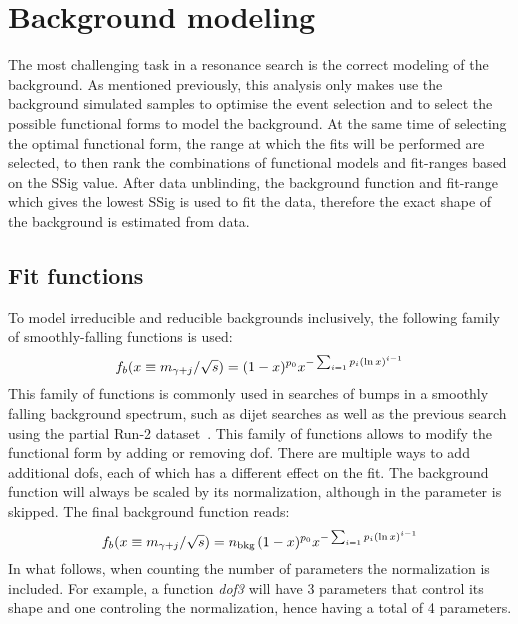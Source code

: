 \section{Background modeling}
\label{sec:bkg:modeling}


The most challenging task in a resonance search is the correct modeling of the background. As mentioned previously, this analysis only makes use the background simulated samples to optimise the event selection and to select the possible functional forms to model the background. At the same time of selecting the optimal functional form, the range at which the fits will be performed are selected, to then rank the combinations of functional models and fit-ranges based on the \ac{SSig} value.
After data unblinding, the background function and fit-range which gives the lowest \ac{SSig} is used to fit the data, therefore the exact shape of the background is estimated from data.










\subsection{Fit functions}
\label{subsec:bkg:modeling:functions}


To model irreducible and reducible backgrounds inclusively, the following family of smoothly-falling functions is used:
\begin{equation}
    \label{eq:bkg:modeling:functions:general_equation}
    f_{b}( x \equiv m_{\gamma+j} / \sqrt{s}) = (1-x)^{p_0} x^{-\sum_{i=1} p_i \left(\ln x\right)^{i-1}} 
\end{equation}
This family of functions is commonly used in searches of bumps in a smoothly falling background spectrum, such as dijet searches as well as the previous \gammajet search using the partial Run-2 dataset~\cite{ATLAS-Dijet-2019,ATLAS-PhotonJetResonances-2016}. This family of functions allows to modify the functional form by adding or removing \ac{dof}. There are multiple ways to add additional \acp{dof}, each of which has a different effect on the fit. The background function will always be scaled by its normalization, although in \Eqn{\ref{eq:bkg:modeling:functions:general_equation}} the parameter is skipped. The final background function reads:
\begin{equation}
    \label{eq:bkg:modeling:functions:general_equation_normalization}
    f_{b}( x \equiv m_{\gamma+j} / \sqrt{s}) = n_{\text{bkg}\, }(1-x)^{p_0} x^{-\sum_{i=1} p_i \left(\ln x\right)^{i-1}} 
\end{equation}
In what follows, when counting the number of parameters the normalization is included. For example, a function \textit{dof3} will have 3 parameters that control its shape and one controling the normalization, hence having a total of 4 parameters.

